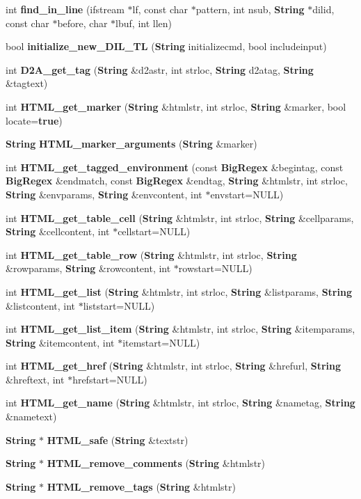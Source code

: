 \begin{CompactItemize}
\item 
int {\bf find\_\-in\_\-line} (ifstream $\ast$lf, const char $\ast$pattern, int nsub, {\bf String} $\ast$dilid, const char $\ast$before, char $\ast$lbuf, int llen)
\item 
bool {\bf initialize\_\-new\_\-DIL\_\-TL} ({\bf String} initializecmd, bool includeinput)
\item 
int {\bf D2A\_\-get\_\-tag} ({\bf String} \&d2astr, int strloc, {\bf String} d2atag, {\bf String} \&tagtext)
\item 
int {\bf HTML\_\-get\_\-marker} ({\bf String} \&htmlstr, int strloc, {\bf String} \&marker, bool locate={\bf true})
\item 
{\bf String} {\bf HTML\_\-marker\_\-arguments} ({\bf String} \&marker)
\item 
int {\bf HTML\_\-get\_\-tagged\_\-environment} (const {\bf Big\-Regex} \&begintag, const {\bf Big\-Regex} \&endmatch, const {\bf Big\-Regex} \&endtag, {\bf String} \&htmlstr, int strloc, {\bf String} \&envparams, {\bf String} \&envcontent, int $\ast$envstart=NULL)
\item 
int {\bf HTML\_\-get\_\-table\_\-cell} ({\bf String} \&htmlstr, int strloc, {\bf String} \&cellparams, {\bf String} \&cellcontent, int $\ast$cellstart=NULL)
\item 
int {\bf HTML\_\-get\_\-table\_\-row} ({\bf String} \&htmlstr, int strloc, {\bf String} \&rowparams, {\bf String} \&rowcontent, int $\ast$rowstart=NULL)
\item 
int {\bf HTML\_\-get\_\-list} ({\bf String} \&htmlstr, int strloc, {\bf String} \&listparams, {\bf String} \&listcontent, int $\ast$liststart=NULL)
\item 
int {\bf HTML\_\-get\_\-list\_\-item} ({\bf String} \&htmlstr, int strloc, {\bf String} \&itemparams, {\bf String} \&itemcontent, int $\ast$itemstart=NULL)
\item 
int {\bf HTML\_\-get\_\-href} ({\bf String} \&htmlstr, int strloc, {\bf String} \&hrefurl, {\bf String} \&hreftext, int $\ast$hrefstart=NULL)
\item 
int {\bf HTML\_\-get\_\-name} ({\bf String} \&htmlstr, int strloc, {\bf String} \&nametag, {\bf String} \&nametext)
\item 
{\bf String} $\ast$ {\bf HTML\_\-safe} ({\bf String} \&textstr)
\item 
{\bf String} $\ast$ {\bf HTML\_\-remove\_\-comments} ({\bf String} \&htmlstr)
\item 
{\bf String} $\ast$ {\bf HTML\_\-remove\_\-tags} ({\bf String} \&htmlstr)

\end{CompactItemize}
